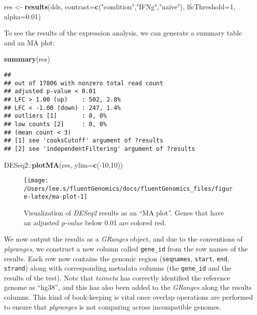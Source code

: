 \documentclass[
]{article}
\newenvironment{Shaded}{}{}
\newcommand{\DataTypeTok}[1]{\textcolor[rgb]{0.56,0.13,0.00}{#1}}
\newcommand{\DecValTok}[1]{\textcolor[rgb]{0.25,0.63,0.44}{#1}}
\newcommand{\FloatTok}[1]{\textcolor[rgb]{0.25,0.63,0.44}{#1}}
\newcommand{\KeywordTok}[1]{\textcolor[rgb]{0.00,0.44,0.13}{\textbf{#1}}}
\newcommand{\NormalTok}[1]{#1}
\newcommand{\OperatorTok}[1]{\textcolor[rgb]{0.40,0.40,0.40}{#1}}
\newcommand{\StringTok}[1]{\textcolor[rgb]{0.25,0.44,0.63}{#1}}
\begin{document}
\begin{Shaded}
\begin{Highlighting}[]
\NormalTok{res <-}\StringTok{ }\KeywordTok{results}\NormalTok{(dds,}
               \DataTypeTok{contrast=}\KeywordTok{c}\NormalTok{(}\StringTok{"condition"}\NormalTok{,}\StringTok{"IFNg"}\NormalTok{,}\StringTok{"naive"}\NormalTok{),}
               \DataTypeTok{lfcThreshold=}\DecValTok{1}\NormalTok{, }\DataTypeTok{alpha=}\FloatTok{0.01}\NormalTok{)}
\end{Highlighting}
\end{Shaded}

To see the results of the expression analysis, we can generate a summary table
and an MA plot:

\begin{Shaded}
\begin{Highlighting}[]
\KeywordTok{summary}\NormalTok{(res)}
\end{Highlighting}
\end{Shaded}

\begin{verbatim}
## 
## out of 17806 with nonzero total read count
## adjusted p-value < 0.01
## LFC > 1.00 (up)    : 502, 2.8%
## LFC < -1.00 (down) : 247, 1.4%
## outliers [1]       : 0, 0%
## low counts [2]     : 0, 0%
## (mean count < 3)
## [1] see 'cooksCutoff' argument of ?results
## [2] see 'independentFiltering' argument of ?results
\end{verbatim}

\begin{Shaded}
\begin{Highlighting}[]
\NormalTok{DESeq2}\OperatorTok{::}\KeywordTok{plotMA}\NormalTok{(res, }\DataTypeTok{ylim=}\KeywordTok{c}\NormalTok{(}\OperatorTok{-}\DecValTok{10}\NormalTok{,}\DecValTok{10}\NormalTok{))}
\end{Highlighting}
\end{Shaded}

\begin{figure}

{\centering \texttt{[image: /Users/lee.s/fluentGenomics/docs/fluentGenomics\_files/figure-latex/ma-plot-1]} 

}

\caption{Visualization of \emph{DESeq2} results as an ``MA plot''. Genes that have
an adjusted \emph{p-value} below 0.01 are colored red.}\label{fig:ma-plot}
\end{figure}

We now output the results as a \emph{GRanges} object, and due to the conventions of
\emph{plyranges}, we construct a new column called \texttt{gene\_id} from the row names of
the results. Each row now contains the genomic region (\texttt{seqnames}, \texttt{start},
\texttt{end}, \texttt{strand}) along with corresponding metadata columns (the \texttt{gene\_id} and
the results of the test). Note that \emph{tximeta} has correctly identified the
reference genome as ``hg38'', and this has also been added to the \emph{GRanges} along
the results columns. This kind of book-keeping is vital once overlap operations
are performed to ensure that \emph{plyranges} is not comparing across incompatible
genomes.
\end{document}
